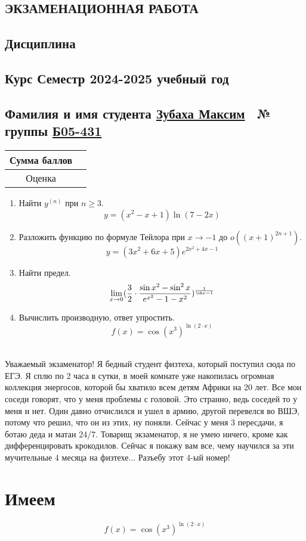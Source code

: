 \documentclass{article}
\begin{document}
\begin{Large}
\begin{onehalfspace}
\begin{center}
\section*{\huge ЭКЗАМЕНАЦИОННАЯ РАБОТА}
\subsection*{\large Дисциплина }
\subsection*{Курс  Семестр  2024-2025 учебный год}
\subsection*{Фамилия и имя студента \underline{Зубаха Максим}\ \hspace{2cm} № группы \underline{Б05-431}}
\begin{tabular}{|c|c|}
\hline 
Сумма баллов & \hspace{8cm} \\ 
\hline 
Оценка & \hspace{8cm} \\ 
\hline 
\end{tabular} 
\vspace{1cm} 
\hline 
\end{center} 
\begin{large} 
\begin{enumerate} 
\item Найти $y^{(n)}$ при $n \geq 3$. $$y = (x^2 - x + 1)\ln(7-2x)$$ 
\hline 
\item Разложить функцию по формуле Тейлора при $x \rightarrow -1$ до $o((x + 1)^{2n+1})$. $$y = (3x^2 + 6x + 5)e^{2x^2+4x-1}$$ 
\hline 
\item Найти предел. $$\lim\limits_{x \rightarrow 0}(\frac{3}{2} \cdot \frac{\sin{x^2} - \sin^2 x}{e^{x^2} - 1 - x^2})^{\frac{1}{\ch x - 1}}$$ 
\hline 
\item Вычислить производную, ответ упростить. 
$$ f(x) = \cos(x^{3})^{\ln(2 \cdot x)}$$\ \hline \
\end{enumerate}
\end{large}
Уважаемый экзаменатор! Я бедный студент физтеха, который поступил сюда по ЕГЭ. Я сплю по 2 часа в сутки, в моей комнате уже накопилась огромная коллекция энергосов, которой бы хватило всем детям Африки на 20 лет. Все мои соседи говорят, что у меня проблемы с головой. Это странно, ведь соседей то у меня и нет. Один давно отчислился и ушел в армию, другой перевелся во ВШЭ, потому что решил, что он из этих, ну поняли. Сейчас у меня 3 пересдачи, я ботаю деда и матан 24/7. Товарищ экзаменатор, я не умею ничего, кроме как дифференцировать крокодилов. Сейчас я покажу вам все, чему научился за эти мучительные 4 месяца на физтехе... Разъебу этот 4-ый номер!
\newpage \section*{Имеем}$$ f(x) = \cos(x^{3})^{\ln(2 \cdot x)}$$

\end{onehalfspace}
\end{Large}
\end{document}
